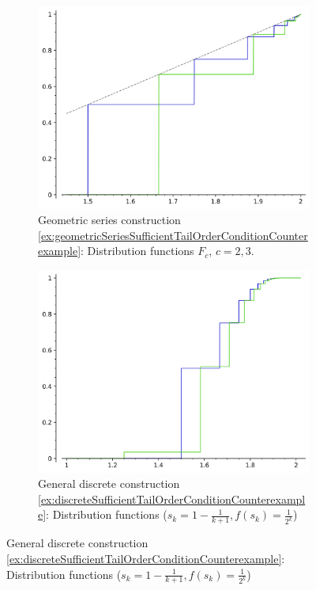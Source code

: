 \documentclass[a4paper,DIV=11,abstracton,twoside=semi]{scrreprt}
\theoremstyle{definition}
\begin{document}
    \begin{figure}
        \centering
        \begin{subfigure}[b]{0.49\textwidth}
            \includegraphics[width=\textwidth]{Pictures/geometric-series-distribution-2-3-half.png}
            \caption{Geometric series construction \ref{ex:geometricSeriesSufficientTailOrderConditionCounterexample}: Distribution functions $F_c$, $c=2, 3$.}
            \label{fig:distributionsGeometricSeriesCounterexample-2-3}
        \end{subfigure}
        \begin{subfigure}[b]{0.49\textwidth}
            \includegraphics[width=\textwidth]{Pictures/little-shifts-distribution.png}
            \caption{General discrete construction \ref{ex:discreteSufficientTailOrderConditionCounterexample}: Distribution functions ($s_k = 1-\frac{1}{k+1}, f(s_k) = \frac{1}{2^k}$)}
            \label{fig:littleShiftsCounterexample-distribution}
        \end{subfigure}
        

\end{figure}
\end{document}
